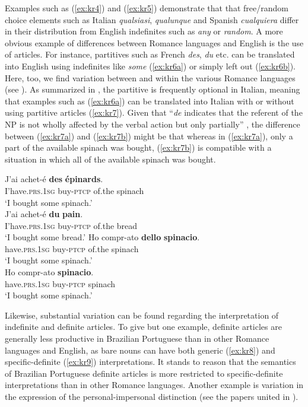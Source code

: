 \documentclass[output=paper,colorlinks,citecolor=brown]{langscibook}
\begin{document}
Examples such as (\ref{ex:kr4}) and (\ref{ex:kr5}) demonstrate that that free/random choice elements such as Italian \textit{qualsiasi}, \textit{qualunque} and Spanish \textit{cualquiera} differ in their distribution from English indefinites such as \textit{any} or \textit{random}. A more obvious example of differences between Romance languages and English is the use of articles. For instance, partitives such as French \textit{des}, \textit{du} etc. can be translated into English using indefinites like \textit{some} (\ref{ex:kr6a}) or simply left out (\ref{ex:kr6b}). Here, too, we find variation between and within the various Romance languages (see \cite{GiustiCardinaletti2018}). As summarized in \citet{CarlierLamiroy2014}, the partitive is frequently optional in Italian, meaning that examples such as (\ref{ex:kr6a}) can be translated into Italian with or without using partitive articles (\ref{ex:kr7}). Given that “\textit{de} indicates that the referent of the NP is not wholly affected by the verbal action but only partially” \citep[55]{Carlier2013}, the difference between (\ref{ex:kr7a}) and (\ref{ex:kr7b}) might be that whereas in (\ref{ex:kr7a}), only a part of the available spinach was bought, (\ref{ex:kr7b}) is compatible with a situation in which all of the available spinach was bought.

\ea
    \ea\label{ex:kr6a} 
    \gll J'ai achet-é \textbf{des} \textbf{épinards}.\\
     I'have.\textsc{prs.1sg} buy-\textsc{ptcp} of.the spinach\\
    \glt ‘I bought some spinach.’\\
    \ex\label{ex:kr6b}
    \gll J'ai achet-é \textbf{du} \textbf{pain}.\\
     I'have.\textsc{prs.1sg} buy-\textsc{ptcp} of.the bread\\
\glt ‘I bought some bread.’ 
    \z
\ex\label{ex:kr7} 
    \ea\label{ex:kr7a} 
    \gll Ho compr-ato \textbf{dello} \textbf{spinacio}.\\
     have.\textsc{prs.1sg} buy-\textsc{ptcp} of.the spinach\\
    \glt ‘I bought some spinach.’\\
    \ex\label{ex:kr7b}
    \gll Ho compr-ato \textbf{spinacio}.\\
     have.\textsc{prs.1sg} buy-\textsc{ptcp} spinach\\
    \glt ‘I bought some spinach.’\\
    \z
\z

Likewise, substantial variation can be found regarding the interpretation of indefinite and definite articles. To give but one example, definite articles are generally less productive in Brazilian Portuguese than in other Romance languages and English, as bare nouns can have both generic (\ref{ex:kr8}) and specific-definite (\ref{ex:kr9}) interpretations. It stands to reason that the semantics of Brazilian Portuguese definite articles is more restricted to specific-definite interpretations than in other Romance languages. Another example is variation in the expression of the personal-impersonal distinction (see the papers united in \citealt{Posio2023}).
\end{document}

